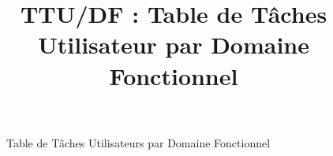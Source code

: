 

\title{TTU/DF : Table de Tâches Utilisateur par Domaine Fonctionnel}


\maketitle

\begin{figure}[h!]
\begin{center}
    
\end{center}
\caption{Table de Tâches Utilisateurs par Domaine Fonctionnel}
\end{figure}


